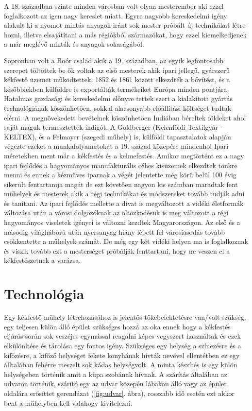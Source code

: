 \documentclass[fontsize=12pt, appendixprefix=true]{scrreprt}
\begin{document}
A 18. században szinte minden városban volt olyan mesterember aki ezzel foglalkozott az igen nagy kereslet miatt. Egyre nagyobb kereskedelmi igény alakult ki a nyomot mintás anyagok iránt sok mester próbált új technikákat létre hozni, illetve  elsajátítani a más régiókból származókat, hogy ezzel kiemelkedjenek a már meglévő minták és anyagok sokaságából.

Sopronban volt a Boór család akik a 19. században, az egyik legfontosabb szerepet töltöttek be ők voltak az első mesterek akik ipari jellegű, gyárszerű  kékfestő üzemet működtettek.
1852 és 1861 között elkezdték a bővítést, és a későbbiekben külföldre is exportálták termékeiket Európa minden pontjára. Hatalmas gazdasági és kereskedelmi előnyre tettek szert a kialakított gyártás technológiának köszönhetően, sokkal alacsonyabb előállítási költséget tudtak elérni. A megnövekedett bevételnek köszönhetően Indiában béreltek földeket ahol saját maguk termesztették indigót.
A Goldberger (Kelenföldi Textilgyár - KELTEX), és a Felmayer (szegedi műhely) is, külföldi tapasztalatok alapján végezte ezeket a  munkafolyamatokat a 19. század közepére mindenhol Ipari méretekben ment már a kékfestés és a kelmefestés.
Amikor megtörtént ez a nagy ipari fejlődés a hagyományos manufakturális céhes kisüzemek elkezdtek tönkre menni és ennek a kézműves iparnak a végét jelentette még körü belül 100 évig sikerült fentartanija magát de ezt követően nagyon kis számban maradtak fent műhelyek és mesterek akik a régi technikákat és módszereket tovább tudják adni és tanítani.
Az ipari fejlődés mellette a divat is megváltozott a vidéki életformák változása után a városi dolgozóknak az öltözködésük is meg változott a régi hagyományos viseletek igényei is változni kezdtek Magyarországon.
Az első és a másodig világháború után nyersanyag hiány lépett fel városiasodás tovább csökkentette a műhelyek számát.
De még egy két vidéki helyen ma is foglalkoznak és viszik tovább ezt a mesterséget próbálják fenttartani, hogy ne veszen el a kékfestészetnek a varázsa.

\section{Technológia}
Egy kékfestő műhely létrehozásához is jelentős tőkebefektetésre van/volt szűkség, egy teljesen külön álló épület szükséges hozzá az oka ennek hogy a kékfestés eljárás során sok veszéjes egymással reagálni képes vegyszert használtak és ezek elkülönítése és tárolása egy fontos igény. Szükséges egy helység a színezésre és a kifőzésre, a  kifőző helységet fekete konyhának hívták nevével ellentétben ez egy álltalában fehérre meszelt sok kádas helységvolt. A minta készítés is egy külön helységeben történik amit a küpa szobának hívnak. A szárítás általában az udvaron történik, száritó egy az udvar közepén lábakon álló vagy az épület oldalára erősíttet gerendázat (\ref{fig:udvar}. ábra), rosszabb idő esetén ezt akkor bent a műhelyben  kell valahogy kivitelezni.
\end{document}
